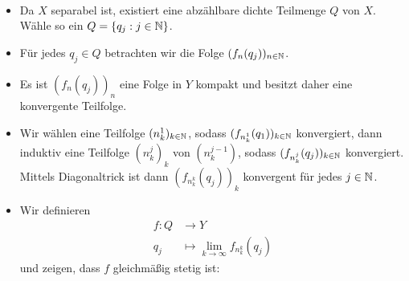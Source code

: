 \begin{beweis}
	\mbox{} \\[-.9cm]
	\begin{itemize}
		\item Da $X$ separabel ist, existiert eine abzählbare dichte Teilmenge $Q$ von $X$.
		Wähle so ein $Q = \{q_j : j \in \mathbb{N}\}$.
		\item Für jedes $q_j \in Q$ betrachten wir die Folge $(f_n(q_j))_{n \in \mathbb{N}}$.
		\item Es ist $(f_n(q_j))_n$ eine Folge in $Y$ kompakt und besitzt daher eine konvergente Teilfolge.
		\item Wir wählen eine Teilfolge $(n_k^1)_{k \in \mathbb{N}}$, sodass $(f_{n_k^1}(q_1))_{k \in \mathbb{N}}$ konvergiert, dann induktiv eine Teilfolge $(n_k^j)_k$ von $(n_k^{j-1})$, sodass $(f_{n_k^j}(q_j))_{k \in \mathbb{N}}$ konvergiert.
		Mittels Diagonaltrick ist dann $(f_{n_k^k}(q_j))_k$ konvergent für jedes $j \in \mathbb{N}$.
		\item Wir definieren 
		\begin{align*}
			f \colon Q &\longrightarrow Y \\
			q_j &\longmapsto \lim\limits_{k \rightarrow \infty} f_{n_k^k}(q_j)
		\end{align*}
		und zeigen, dass $f$ gleichmäßig stetig ist:
		

\end{itemize}
\end{beweis}
